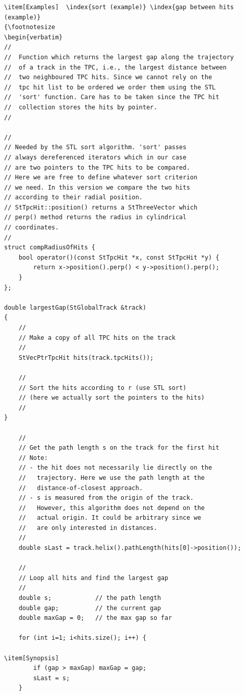 \begin{enumerate}
\begin{Entry}
\begin{Entry}
{\begin{verbatim}
\item[Examples]  \index{sort (example)} \index{gap between hits (example)}
{\footnotesize
\begin{verbatim}
//
//  Function which returns the largest gap along the trajectory
//  of a track in the TPC, i.e., the largest distance between
//  two neighboured TPC hits. Since we cannot rely on the
//  tpc hit list to be ordered we order them using the STL
//  'sort' function. Care has to be taken since the TPC hit
//  collection stores the hits by pointer.
//

//
// Needed by the STL sort algorithm. 'sort' passes
// always dereferenced iterators which in our case
// are two pointers to the TPC hits to be compared.
// Here we are free to define whatever sort criterion
// we need. In this version we compare the two hits
// according to their radial position.
// StTpcHit::position() returns a StThreeVector which
// perp() method returns the radius in cylindrical
// coordinates.
//
struct compRadiusOfHits {
    bool operator()(const StTpcHit *x, const StTpcHit *y) {
        return x->position().perp() < y->position().perp();
    }
};

double largestGap(StGlobalTrack &track)
{
    //
    // Make a copy of all TPC hits on the track
    //
    StVecPtrTpcHit hits(track.tpcHits());

    //
    // Sort the hits according to r (use STL sort)
    // (here we actually sort the pointers to the hits)
    //
}  

    //
    // Get the path length s on the track for the first hit
    // Note:
    // - the hit does not necessarily lie directly on the
    //   trajectory. Here we use the path length at the
    //   distance-of-closest approach.
    // - s is measured from the origin of the track.
    //   However, this algorithm does not depend on the
    //   actual origin. It could be arbitrary since we
    //   are only interested in distances.
    //
    double sLast = track.helix().pathLength(hits[0]->position());

    //
    // Loop all hits and find the largest gap
    //
    double s;            // the path length
    double gap;          // the current gap
    double maxGap = 0;   // the max gap so far

    for (int i=1; i<hits.size(); i++) {
    
\item[Synopsis] 
        if (gap > maxGap) maxGap = gap;
        sLast = s;
    }


\end{verbatim}}
\end{Entry}
\end{Entry}
\end{enumerate}
